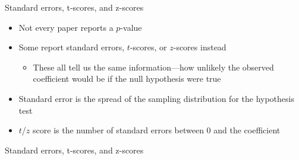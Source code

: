 \begin{frame}{Standard errors, t-scores, and z-scores}
  \begin{itemize}
    \item Not every paper reports a $p$-value
    \item Some report standard errors, $t$-scores, or $z$-scores instead
    \begin{itemize}
      \item These all tell us the same information---how unlikely the observed coefficient would be if the null hypothesis were true
    \end{itemize}
    \item Standard error is the spread of the sampling distribution for the hypothesis test
    \item $t$/$z$ score is the number of standard errors between 0 and the coefficient
  \end{itemize}
\end{frame}

\begin{frame}{Standard errors, t-scores, and z-scores}
\end{frame}

